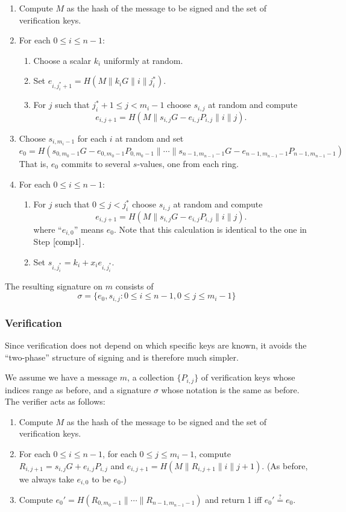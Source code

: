 \documentclass[letterpaper]{article}
\begin{document}
\begin{enumerate}
\item Compute $M$ as the hash of the message to be signed and the set of
verification keys.
\item For each $0\leq i\leq n-1$:
\begin{enumerate}
\item Choose a scalar $k_i$ uniformly at random.
\item Set $e_{i,j^*_i+1} = H(M\| k_iG \| i \| j^*_i)$.
\item For $j$ such that $j^*_i+1\leq j< m_i-1$ choose $s_{i,j}$ at random and
compute
\[ e_{i,j+1} = H(M\| s_{i,j}G - e_{i,j}P_{i,j} \| i \| j). \]
\label{comp1}
\end{enumerate}
\item Choose $s_{i,m_i-1}$ for each $i$ at random and set
\[ e_0 = H(s_{0,m_0-1}G - e_{0,m_0-1}P_{0,m_0-1} \| \cdots \| s_{n-1,m_{n-1}-1}G - e_{n-1,m_{n-1}-1}P_{n-1,m_{n-1}-1}) \]
That is, $e_0$ commits to several $s$-values, one from each ring.
\item For each $0\leq i\leq n-1$:
\begin{enumerate}
\item For $j$ such that $0\leq j< j^*_i$ choose $s_{i,j}$ at random and
compute
\[ e_{i,j+1} = H(M\| s_{i,j}G - e_{i,j}P_{i,j}\|i\|j). \]
where ``$e_{i,0}$'' means $e_0$. Note that this calculation is identical to
the one in Step $\ref{comp1}$.
\item Set $s_{i,j^*_i} = k_i + x_ie_{i,j^*_i}$.
\end{enumerate}
\end{enumerate}

The resulting signature on $m$ consists of
\[ \sigma = \{ e_0, s_{i, j} : 0\leq i\leq n-1, 0\leq j\leq m_i - 1 \} \]

\subsubsection{Verification}

Since verification does not depend on which specific keys are known, it
avoids the ``two-phase'' structure of signing and is therefore much
simpler.

We assume we have a message $m$, a collection $\{ P_{i,j} \}$ of verification
keys whose indices range as before, and a signature $\sigma$ whose notation
is the same as before. The verifier acts as follows:

\begin{enumerate}
\item Compute $M$ as the hash of the message to be signed and the set of
verification keys.
\item For each $0\leq i\leq n -1$,
      for each $0\leq j\leq m_i - 1$, compute $R_{i,j+1} = s_{i,j}G + e_{i,j}P_{i,j}$
and $e_{i,j+1} = H(M\|R_{i,j+1}\|i\|j+1)$. (As before, we always take $e_{i,0}$ to be $e_0$.)
\item Compute $e_0' = H(R_{0,m_0-1} \|\cdots \| R_{n-1,m_{n-1}-1})$ and return 1 iff $e_0'\stackrel{?}{=} e_0$.
\end{enumerate}
\end{document}
